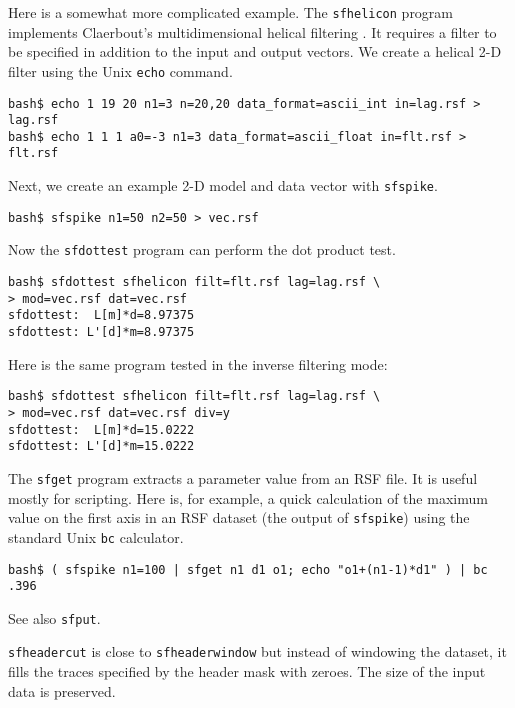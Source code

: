 Here is a somewhat more complicated example. The \texttt{sfhelicon}
program implements Claerbout's multidimensional helical filtering
\cite[]{GEO63-05-15321541}. It requires a filter to be specified in
addition to the input and output vectors. We create a helical 
2-D filter using the Unix \texttt{echo} command.
\begin{verbatim}
bash$ echo 1 19 20 n1=3 n=20,20 data_format=ascii_int in=lag.rsf > lag.rsf
bash$ echo 1 1 1 a0=-3 n1=3 data_format=ascii_float in=flt.rsf > flt.rsf
\end{verbatim}
Next, we create an example 2-D model and data vector with \texttt{sfspike}.
\begin{verbatim}
bash$ sfspike n1=50 n2=50 > vec.rsf
\end{verbatim}
Now the \texttt{sfdottest} program can perform the dot product test.
\begin{verbatim}
bash$ sfdottest sfhelicon filt=flt.rsf lag=lag.rsf \
> mod=vec.rsf dat=vec.rsf
sfdottest:  L[m]*d=8.97375
sfdottest: L'[d]*m=8.97375
\end{verbatim}
Here is the same program tested in the inverse filtering mode:
\begin{verbatim}
bash$ sfdottest sfhelicon filt=flt.rsf lag=lag.rsf \
> mod=vec.rsf dat=vec.rsf div=y
sfdottest:  L[m]*d=15.0222
sfdottest: L'[d]*m=15.0222
\end{verbatim}

\noindent\doublebox{\parbox{\textwidth}{

}}

The \texttt{sfget} program extracts a parameter value from an RSF file. It is
useful mostly for scripting. Here is, for example, a quick calculation of the
maximum value on the first axis in an RSF dataset (the output of
\texttt{sfspike}) using the standard Unix \texttt{bc} calculator.
\begin{verbatim}
bash$ ( sfspike n1=100 | sfget n1 d1 o1; echo "o1+(n1-1)*d1" ) | bc
.396
\end{verbatim}
See also \texttt{sfput}.

\noindent\doublebox{\parbox{\textwidth}{
    
  }}

\texttt{sfheadercut} is close to \texttt{sfheaderwindow} but instead
of windowing the dataset, it fills the traces specified by the header
mask with zeroes. The size of the input data is preserved.

